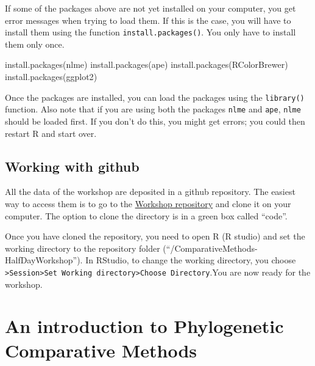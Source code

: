\documentclass[
]{book}
\newenvironment{Shaded}{\begin{snugshade}}{\end{snugshade}}
\newcommand{\FunctionTok}[1]{\textcolor[rgb]{0.00,0.00,0.00}{#1}}
\newcommand{\NormalTok}[1]{#1}
\newcommand{\StringTok}[1]{\textcolor[rgb]{0.31,0.60,0.02}{#1}}
\begin{document}
If some of the packages above are not yet installed on your computer, you get error messages when trying to load them. If this is the case, you will have to install them using the function \texttt{install.packages()}. You only have to install them only once.

\begin{Shaded}
\begin{Highlighting}[]
\FunctionTok{install.packages}\NormalTok{(}\StringTok{\textquotesingle{}nlme\textquotesingle{}}\NormalTok{)}
\FunctionTok{install.packages}\NormalTok{(}\StringTok{\textquotesingle{}ape\textquotesingle{}}\NormalTok{)}
\FunctionTok{install.packages}\NormalTok{(}\StringTok{\textquotesingle{}RColorBrewer\textquotesingle{}}\NormalTok{)}
\FunctionTok{install.packages}\NormalTok{(}\StringTok{\textquotesingle{}ggplot2\textquotesingle{}}\NormalTok{)}
\end{Highlighting}
\end{Shaded}

Once the packages are installed, you can load the packages using the \texttt{library()} function. Also note that if you are using both the packages \texttt{nlme} and \texttt{ape}, \texttt{nlme} should be loaded first. If you don't do this, you might get errors; you could then restart R and start over.

\hypertarget{working-with-github}{%
\section{Working with github}\label{working-with-github}}

All the data of the workshop are deposited in a github repository. The easiest way to access them is to go to the \href{http://www.github.com/simjoly/ComparativeMethods-HalfDayWorkshop}{Workshop repository} and clone it on your computer. The option to clone the directory is in a green box called ``code''.

Once you have cloned the repository, you need to open R (R studio) and set the working directory to the repository folder (``/ComparativeMethods-HalfDayWorkshop''). In RStudio, to change the working directory, you choose \texttt{\textgreater{}Session\textgreater{}Set\ Working\ directory\textgreater{}Choose\ Directory}.You are now ready for the workshop.

\hypertarget{intro}{%
\chapter{An introduction to Phylogenetic Comparative Methods}\label{intro}}
\end{document}
